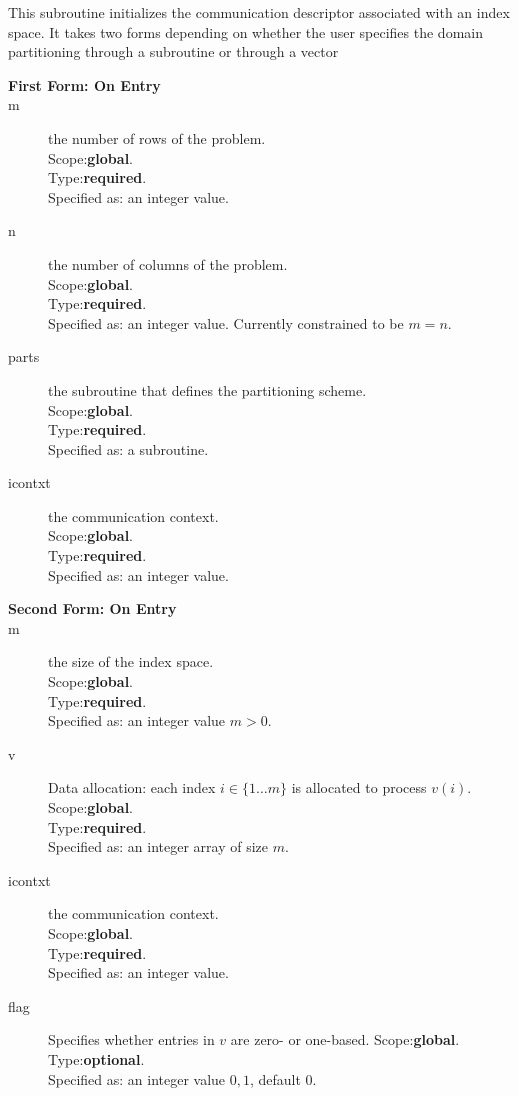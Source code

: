 This subroutine initializes the communication descriptor associated
with an index space. It takes two forms depending on whether the user
specifies the domain partitioning through a subroutine or through a vector
\begin{description}
\item[\bf  First Form: On Entry ]
\item[m] the number of rows of the problem.\\
Scope:{\bf global}.\\
Type:{\bf required}.\\
Specified as: an integer value.
\item[n] the number of columns of the problem.\\
Scope:{\bf global}.\\
Type:{\bf required}.\\
Specified as: an integer value. Currently constrained to be  $m=n$.
\item[parts] the subroutine that defines the partitioning scheme.\\
Scope:{\bf global}.\\
Type:{\bf required}.\\
Specified as: a subroutine. 
\item[icontxt] the communication context.\\
Scope:{\bf global}.\\
Type:{\bf required}.\\
Specified as: an integer value.
\end{description}
\begin{description}
\item[\bf  Second Form: On Entry ]
\item[m] the size of the index space.\\
Scope:{\bf global}.\\
Type:{\bf required}.\\
Specified as: an integer value $m>0$.
\item[v] Data allocation: each index $i\in \{1\dots m\}$ is allocated
  to process $v(i)$.
Scope:{\bf global}.\\
Type:{\bf required}.\\
Specified as: an integer array of size $m$. 
\item[icontxt] the communication context.\\
Scope:{\bf global}.\\
Type:{\bf required}.\\
Specified as: an integer value.
\item[flag] Specifies whether entries in $v$ are zero- or one-based.
Scope:{\bf global}.\\
Type:{\bf optional}.\\
Specified as: an integer value $0,1$, default $0$.
\end{description}

